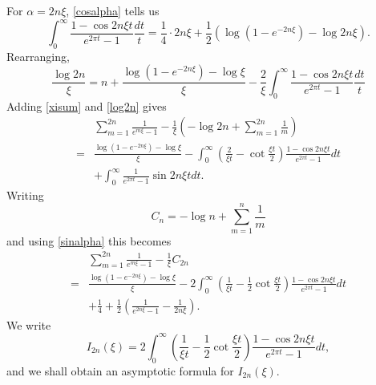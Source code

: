 \documentclass{amsart}
\begin{document}
For $\alpha = 2n\xi$, \eqref{cosalpha} tells us
\[
\int_0^\infty \frac{1-\cos 2n\xi t}{e^{2\pi t}-1} \frac{dt}{t} = \frac{1}{4}\cdot 2n\xi + \frac{1}{2}\left( \log(1-e^{-2n\xi})-\log 2n\xi\right).
\]
Rearranging, 
\begin{equation}
\frac{\log 2n}{\xi} = n + \frac{\log(1-e^{-2n \xi})-\log \xi}{\xi} -\frac{2}{\xi}
\int_0^\infty \frac{1-\cos 2n\xi t}{e^{2\pi t}-1} \frac{dt}{t}
\label{log2n}
\end{equation}
Adding \eqref{xisum} and \eqref{log2n} gives
\[
\begin{split}
&\sum_{m=1}^{2n} \frac{1}{e^{m\xi}-1} - \frac{1}{\xi} \left( - \log 2n+\sum_{m=1}^{2n} \frac{1}{m}  \right)\\
=& \frac{\log(1-e^{-2n \xi})-\log \xi}{\xi}
-\int_0^\infty \left(\frac{2}{\xi t}-\cot \frac{\xi t}{2} \right) \frac{1-\cos 2n\xi t}{e^{2\pi t}-1} dt\\
&+\int_0^\infty \frac{1}{e^{2\pi t}-1}  \sin 2n\xi t dt.
\end{split}
\]
Writing
\[
C_n = -\log n + \sum_{m=1}^n \frac{1}{m}
\]
and using \eqref{sinalpha} this becomes
\[
\begin{split}
&\sum_{m=1}^{2n} \frac{1}{e^{m\xi}-1} - \frac{1}{\xi} C_{2n}\\
=&\frac{\log(1-e^{-2n \xi})-\log \xi}{\xi}
-2\int_0^\infty \left(\frac{1}{\xi t}-\frac{1}{2}\cot \frac{\xi t}{2} \right) \frac{1-\cos 2n\xi t}{e^{2\pi t}-1} dt\\
&+\frac{1}{4}+\frac{1}{2}\left( \frac{1}{e^{2n \xi}-1}-\frac{1}{2n\xi}\right).
\end{split}
\]
We write
\[
I_{2n}(\xi) = 2\int_0^\infty \left(\frac{1}{\xi t}-\frac{1}{2}\cot \frac{\xi t}{2} \right) \frac{1-\cos 2n\xi t}{e^{2\pi t}-1} dt,
\]
and we shall obtain an asymptotic formula for $I_{2n}(\xi)$.
\end{document}
